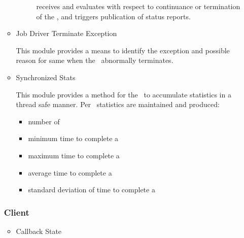 \begin{itemize}
\begin{itemize}
\begin{description}
        receives and evaluates \ORMaps with respect to
        continuance or termination of the \varJobDriver,
        and triggers publication of \varJobDriver status reports.
        \end{description}
      \item{Job Driver Terminate Exception}
        \begin{description}
          This module provides a means to identify the exception and
          possible reason for same when the \varJobDriver~abnormally terminates.
        \end{description}
      \item{Synchronized Stats}
        \begin{description}
          This module provides a method for the \varJobDriver~to accumulate
          statistics in a thread safe manner. 
          Per \varWorkItem~statistics are maintained and produced:
        \end{description}
    
        \begin{itemize} 
            \item{number of \varWorkItems}
            \item{minimum time to complete a \varWorkItem}
            \item{maximum time to complete a \varWorkItem}
            \item{average time to complete a \varWorkItem}
            \item{standard deviation of time to complete a \varWorkItem}
        \end{itemize}
    
    \end{itemize}
    
    \subsubsection{Client}
    
    \begin{itemize} 
    
      \item{Callback State}
        

\end{itemize}
\end{itemize}
